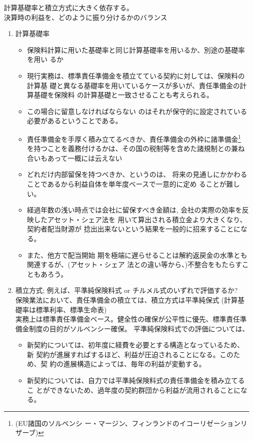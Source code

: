 \documentclass[report,gutter=10mm,fore-edge=10mm,uplatex,dvipdfmx]{jlreq}
\begin{document}
\begin{enumerate}
\begin{enumerate}
計算基礎率と積立方式に大きく依存する。\\
決算時の利益を、どのように振り分けるかのバランス
\begin{enumerate}
 \item 計算基礎率
\begin{itemize}
 \item 保険料計算に用いた基礎率と同じ計算基礎率を用いるか、別途の基礎率を用い
るか
 \item 現行実務は、標準責任準備金を積立てている契約に対しては、保険料の計算基
礎と異なる基礎率を用いているケースが多いが、責任準備金の計算基礎を保険料
の計算基礎と一致させることも考えられる。
 \item この場合に留意しなければならない
のはそれが保守的に設定されている必要があるということである。
 \item 責任準備金を手厚く積み立てるべきか、責任準備金の外枠に諸準備金\footnote{(EU諸国のソルベンシ
ー・マージン、フィンランドのイコーリゼーションリザーブ)}
を持つことを義務付けるかは、その国の税制等を含めた諸規制との兼ね合いもあって一概には云えない
 \item どれだけ内部留保を持つべきか、というのは、
将来の見通しにかかわることであるから利益自体を単年度ベースで一意的に定め
ることが難しい。
 \item 経過年数の浅い時点では会社に留保すべき金額は, 会社の実際の効率を反映したアセット・シェア法を
用いて算出される積立金より大きくなり、契約者配当財源が
捻出出来ないという結果を一般的に招来することになる。
 \item また、他方で配当開始
期を極端に遅らせることは解約返戻金の水準とも関連するが、(アセット・シェア
法との違い等から、)不整合をもたらすこともあろう。
\end{itemize}
 \item 積立方式; 例えば、平準純保険料式 or チルメル式のいずれで評価するか?\\
保険業法において、責任準備金の積立ては、積立方式は平準純保式 (計算基礎率は標準利率、標準生命表)\\
実務上は標準責任準備金ベース。健全性の確保が公平性に優先、標準責任準備金制度の目的がソルベンシー確保。
平準純保険料式での評価については、
\begin{itemize}
 \item 新契約については、初年度に経費を必要とする構造となっているため、新
契約が進展すればするほど、利益が圧迫されることになる。このため、契
約の進展構造によっては、毎年の利益が変動する。
 \item 新契約については、自力では平準純保険料式の責任準備金を積み立てるこ
とができないため、過年度の契約群団から利益が流用されることになる。

\end{itemize}
\end{enumerate}
\end{enumerate}
\end{enumerate}
\end{document}
